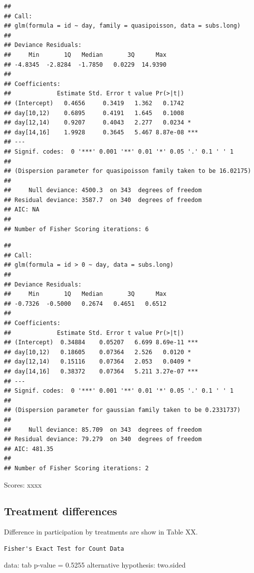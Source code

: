 \documentclass[12pt,]{article}
\theoremstyle{plain} %
\begin{document}
\begin{verbatim}
## 
## Call:
## glm(formula = id ~ day, family = quasipoisson, data = subs.long)
## 
## Deviance Residuals: 
##     Min       1Q   Median       3Q      Max  
## -4.8345  -2.8284  -1.7850   0.0229  14.9390  
## 
## Coefficients:
##             Estimate Std. Error t value Pr(>|t|)    
## (Intercept)   0.4656     0.3419   1.362   0.1742    
## day[10,12)    0.6895     0.4191   1.645   0.1008    
## day[12,14)    0.9207     0.4043   2.277   0.0234 *  
## day[14,16]    1.9928     0.3645   5.467 8.87e-08 ***
## ---
## Signif. codes:  0 '***' 0.001 '**' 0.01 '*' 0.05 '.' 0.1 ' ' 1
## 
## (Dispersion parameter for quasipoisson family taken to be 16.02175)
## 
##     Null deviance: 4500.3  on 343  degrees of freedom
## Residual deviance: 3587.7  on 340  degrees of freedom
## AIC: NA
## 
## Number of Fisher Scoring iterations: 6
\end{verbatim}

\begin{verbatim}
## 
## Call:
## glm(formula = id > 0 ~ day, data = subs.long)
## 
## Deviance Residuals: 
##     Min       1Q   Median       3Q      Max  
## -0.7326  -0.5000   0.2674   0.4651   0.6512  
## 
## Coefficients:
##             Estimate Std. Error t value Pr(>|t|)    
## (Intercept)  0.34884    0.05207   6.699 8.69e-11 ***
## day[10,12)   0.18605    0.07364   2.526   0.0120 *  
## day[12,14)   0.15116    0.07364   2.053   0.0409 *  
## day[14,16]   0.38372    0.07364   5.211 3.27e-07 ***
## ---
## Signif. codes:  0 '***' 0.001 '**' 0.01 '*' 0.05 '.' 0.1 ' ' 1
## 
## (Dispersion parameter for gaussian family taken to be 0.2331737)
## 
##     Null deviance: 85.709  on 343  degrees of freedom
## Residual deviance: 79.279  on 340  degrees of freedom
## AIC: 481.35
## 
## Number of Fisher Scoring iterations: 2
\end{verbatim}

Scores: xxxx

\subsection{Treatment differences}\label{treatment-differences}

Difference in participation by treatments are show in Table XX.

\begin{verbatim}
Fisher's Exact Test for Count Data
\end{verbatim}

data: tab p-value = 0.5255 alternative hypothesis: two.sided
\end{document}
